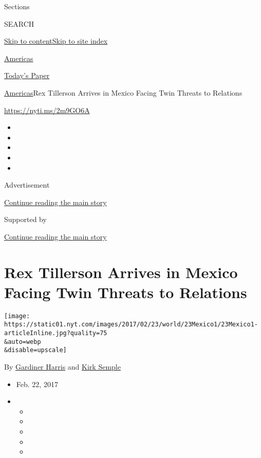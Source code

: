 Sections

SEARCH

\protect\hyperlink{site-content}{Skip to
content}\protect\hyperlink{site-index}{Skip to site index}

\href{https://www.nytimes.com/section/world/americas}{Americas}

\href{https://myaccount.nytimes.com/auth/login?response_type=cookie\&client_id=vi}{}

\href{https://www.nytimes.com/section/todayspaper}{Today's Paper}

\href{/section/world/americas}{Americas}\textbar{}Rex Tillerson Arrives
in Mexico Facing Twin Threats to Relations

\url{https://nyti.ms/2m9GO6A}

\begin{itemize}
\item
\item
\item
\item
\item
\end{itemize}

Advertisement

\protect\hyperlink{after-top}{Continue reading the main story}

Supported by

\protect\hyperlink{after-sponsor}{Continue reading the main story}

\hypertarget{rex-tillerson-arrives-in-mexico-facing-twin-threats-to-relations}{%
\section{Rex Tillerson Arrives in Mexico Facing Twin Threats to
Relations}\label{rex-tillerson-arrives-in-mexico-facing-twin-threats-to-relations}}

\texttt{[image: https://static01.nyt.com/images/2017/02/23/world/23Mexico1/23Mexico1-articleInline.jpg?quality=75\\\&auto=webp\\\&disable=upscale]}

By \href{http://www.nytimes.com/by/gardiner-harris}{Gardiner Harris} and
\href{http://www.nytimes.com/by/kirk-semple}{Kirk Semple}

\begin{itemize}
\item
  Feb. 22, 2017
\item
  \begin{itemize}
  \item
  \item
  \item
  \item
  \item
  \end{itemize}
\end{itemize}

